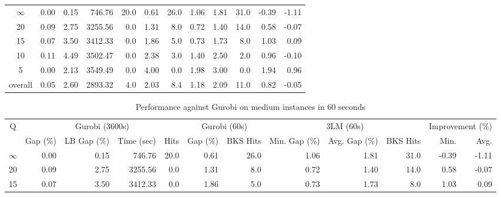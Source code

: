 \begin{table}[H]
\begin{tabular}{c rrrr rr rrr rr}
\cmidrule(lr){1-1} \cmidrule(lr){2-5} \cmidrule(lr){2-5} \cmidrule(lr){6-7} \cmidrule(lr){8-10} \cmidrule(lr){11-12}
$\infty$ &           0.00 &        0.15 &     746.76 & 20.0 &         0.61 &     26.0 &          1.06 &          1.81 &     31.0 &            -0.39 & -1.11 \\
      20 &           0.09 &        2.75 &    3255.56 &  0.0 &         1.31 &      8.0 &          0.72 &          1.40 &     14.0 &             0.58 & -0.07 \\
      15 &           0.07 &        3.50 &    3412.33 &  0.0 &         1.86 &      5.0 &          0.73 &          1.73 &      8.0 &             1.03 &  0.09 \\
      10 &           0.11 &        4.49 &    3502.47 &  0.0 &         2.38 &      3.0 &          1.40 &          2.50 &      2.0 &             0.96 & -0.10 \\
       5 &           0.00 &        2.13 &    3549.49 &  0.0 &         4.00 &      0.0 &          1.98 &          3.00 &      0.0 &             1.94 &  0.96 \\
\midrule
 overall &           0.05 &        2.60 &    2893.32 &  4.0 &         2.03 &      8.4 &          1.18 &          2.09 &     11.0 &             0.82 & -0.05 \\
\bottomrule
\end{tabular}
\end{table}\begin{table}[H]
\centering
\caption{Performance against Gurobi on medium instances in 60 seconds}
\label{tab:3lm_resuts150T60}
\begin{tabular}{c rrrr rr rrr rr}
\toprule
       Q & \multicolumn{4}{c}{Gurobi (3600s)} & \multicolumn{2}{c}{Gurobi (60s)} & \multicolumn{3}{c}{3LM (60s)} & \multicolumn{2}{c}{Improvement (\%)} \\
         &       Gap (\%) & LB Gap (\%) & Time (sec) & Hits &     Gap (\%) & BKS Hits & Min. Gap (\%) & Avg. Gap (\%) & BKS Hits &             Min. &  Avg. \\
\cmidrule(lr){1-1} \cmidrule(lr){2-5} \cmidrule(lr){2-5} \cmidrule(lr){6-7} \cmidrule(lr){8-10} \cmidrule(lr){11-12}
$\infty$ &           0.00 &        0.15 &     746.76 & 20.0 &         0.61 &     26.0 &          1.06 &          1.81 &     31.0 &            -0.39 & -1.11 \\
      20 &           0.09 &        2.75 &    3255.56 &  0.0 &         1.31 &      8.0 &          0.72 &          1.40 &     14.0 &             0.58 & -0.07 \\
      15 &           0.07 &        3.50 &    3412.33 &  0.0 &         1.86 &      5.0 &          0.73 &          1.73 &      8.0 &             1.03 &  0.09 \\

\end{tabular}
\end{table}
